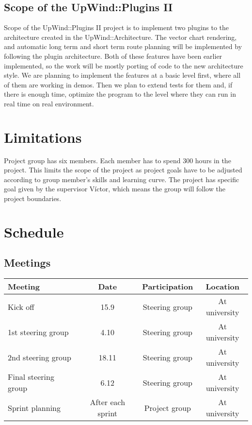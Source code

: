 \documentclass[12pt,titlepage]{article}
\begin{document}
	\subsection{Scope of the UpWind::Plugins II}
 
		Scope of the UpWind::Plugins II project is to implement two plugins to the architecture created in the UpWind::Architecture.
		The vector chart rendering, and automatic long term and short term route planning will be implemented by following the plugin architecture.
		Both of these features have been earlier implemented, so the work will be mostly porting of code to the new architecture style.
		We are planning to implement the features at a basic level first, where all of them are working in demos.
		Then we plan to extend tests for them and, if there is enough time, optimize the program to the level where they can run in real time on real environment.

\section{Limitations}
	Project group has six members. Each member has to spend 300 hours in the project.
	This limits the scope of the project as project goals have to be adjusted according to group member's skills and learning curve.
	The project has specific goal given by the supervisor Víctor, which means the group will follow the project boundaries.

\section{Schedule}
 
	\subsection{Meetings}

		\begin{center}
		\begin{tabular}{|l|c|c|c|}
			\hline
			\textbf{Meeting} & \textbf{Date} & \textbf{Participation} & \textbf{Location} \\
			\hline
			\hline
			Kick off & 15.9 & Steering group & At university \\
			\hline
			1st steering group & 4.10 & Steering group & At university \\
			\hline
			2nd steering group & 18.11 & Steering group & At university \\
			\hline
			Final steering group & 6.12 & Steering group & At university \\
			\hline
			Sprint planning & After each sprint & Project group & At university \\
			\hline
		\end{tabular}
		\end{center}	
 
\end{document}
